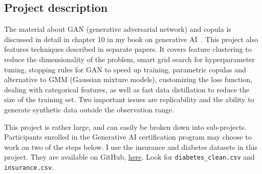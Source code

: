 \documentclass[oneside,10pt]{book}
\begin{document}
\subsection{Project description}\label{ot6zej7}

The material about GAN (\textcolor{index}{generative adversarial network}) and \textcolor{index}{copula} is discussed in detail in chapter 10 in my book on generative AI~\cite{vgelsevier}.  This project also features techniques described in separate papers.
 It covers feature clustering to reduce the dimensionality of the problem, smart grid search for hyperparameter tuning, stopping rules for GAN to speed up training, parametric copulas and alternative to GMM (Gaussian mixture models), customizing the loss function, dealing with categorical features, as well as fast data distillation to reduce the size of the training set. Two important issues are replicability and the ability to generate synthetic data outside the observation range. 

This project is rather large, and can easily be broken down into sub-projects. Participants enrolled in the Generative AI certification program may choose to work on two of the steps below. I use the insurance and diabetes datasets in this project. They are available on GitHub, 
 \href{https://github.com/VincentGranville/Main/blob/main/}{here}. Look for \texttt{diabetes\_clean.csv} and \texttt{insurance.csv}.
\end{document}
